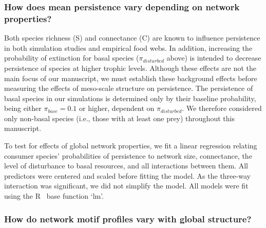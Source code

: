 \documentclass[12pt]{article}
\begin{document}
\begin{spacing}{2.0}
        \subsubsection*{How does mean persistence vary depending on network properties?}
        
            Both species richness (S) and connectance (C) are known to influence persistence in both simulation studies and empirical food webs.
            In addition, increasing the probability of extinction for basal species ($\pi_{disturbed}$ above) is intended to decrease persistence of species at higher trophic levels.
            Although these effects are not the main focus of our manuscript, we must establish these background effects before measuring the effects of meso-scale structure on persistence.
            The persistence of basal species in our simulations is determined only by their baseline probability, being either $\pi_{base} = 0.1$ or higher, dependent on $\pi_{disturbed}$.
            We therefore considered only non-basal species (i.e., those with at least one prey) throughout this manuscript.

            To test for effects of global network properties, we fit a linear regression relating consumer species' probabilities of persistence to network size, connectance, the level of disturbance to basal resources, and all interactions between them. 
            All predictors were centered and scaled before fitting the model. 
            As the three-way interaction was significant, we did not simplify the model.
            All models were fit using the R~\citep{R} base function `lm'.

        
        \subsubsection*{How do network motif profiles vary with global structure?}
        

\end{spacing}
\end{document}
